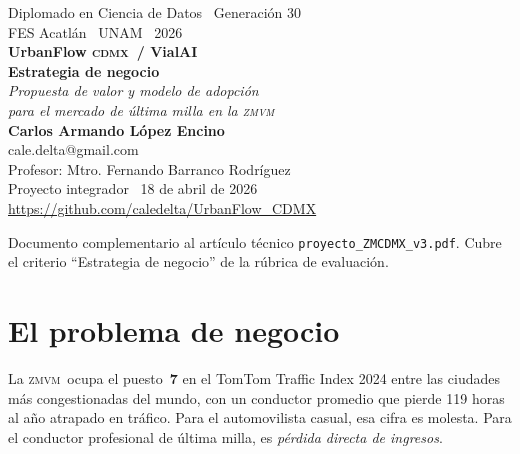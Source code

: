 \documentclass[11pt,a4paper]{article}
\newcommand{\VialAI}{\textbf{\textcolor{vialTeal}{Vial}\textcolor{vialAmber}{AI}}}
\newcommand{\ZMVM}{\textsc{zmvm}}
\newcommand{\CDMX}{\textsc{cdmx}}
\begin{document}
\begin{titlepage}
\centering
\vspace*{1.5cm}

{\color{vialMuted}\large Diplomado en Ciencia de Datos \textbullet\ Generación 30}\\[0.3em]
{\color{vialMuted}\small FES Acatlán \textbullet\ UNAM \textbullet\ 2026}\\[2cm]

{\color{vialTeal}\Huge\bfseries UrbanFlow \CDMX\ / \VialAI}\\[0.8em]
{\color{vialNavy}\LARGE\bfseries Estrategia de negocio}\\[0.5em]
{\color{vialMuted}\large\itshape Propuesta de valor y modelo de adopción\\
para el mercado de última milla en la \ZMVM}\\[2.5cm]

{\large\textbf{Carlos Armando López Encino}}\\
{\small\color{vialMuted}cale.delta@gmail.com}\\[0.6em]
{\small Profesor: Mtro. Fernando Barranco Rodríguez}\\[2cm]

{\color{vialMuted}\small Proyecto integrador \textbullet\ 18 de abril de 2026}\\[0.4em]
{\color{vialAqua}\small\url{https://github.com/caledelta/UrbanFlow_CDMX}}

\vfill
{\color{vialMuted}\footnotesize
Documento complementario al artículo técnico \texttt{proyecto\_ZMCDMX\_v3.pdf}.
Cubre el criterio ``Estrategia de negocio'' de la rúbrica de evaluación.}
\end{titlepage}

\newpage
\tableofcontents
\newpage

\section{El problema de negocio}

La \ZMVM\ ocupa el puesto~\textbf{7} en el TomTom Traffic Index 2024
entre las ciudades más congestionadas del mundo, con un conductor
promedio que pierde \num{119} horas al año atrapado en tráfico. Para
el automovilista casual, esa cifra es molesta. Para el conductor
profesional de última milla, es \emph{pérdida directa de ingresos}.
\end{document}
